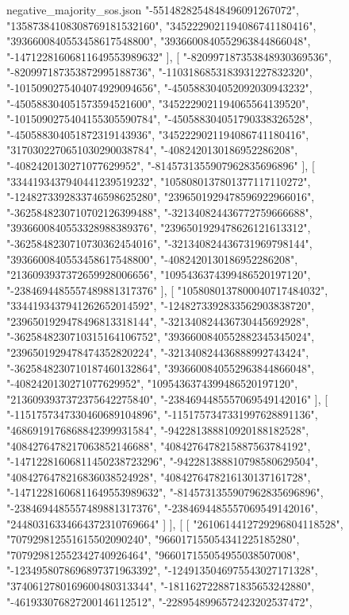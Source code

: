 \begin{filecontents*}[overwrite]{negative_majority_sos.json}
    "-5514828254848496091267072",
    "13587384108308769181532160",
    "3452229021194086741180416",
    "3936600840553458617548800",
    "3936600840552963844866048",
    "-14712281606811649553989632"
   ],
   [
    "-820997187353848930369536",
    "-820997187353872995188736",
    "-1103186853183931227832320",
    "-1015090275404074929094656",
    "-450588304052092030943232",
    "-450588304051573594521600",
    "3452229021194065564139520",
    "-1015090275404155305590784",
    "-450588304051790338326528",
    "-450588304051872319143936",
    "3452229021194086741180416",
    "3170302270651030290038784",
    "-4082420130186952286208",
    "-4082420130271077629952",
    "-8145731355907962835696896"
   ],
   [
    "3344193437940441239519232",
    "1058080137801377117110272",
    "-1248273392833746598625280",
    "2396501929478596922966016",
    "-3625848230710702126399488",
    "-321340824436772759666688",
    "3936600840553328988389376",
    "2396501929478626121613312",
    "-3625848230710730362454016",
    "-321340824436731969798144",
    "3936600840553458617548800",
    "-4082420130186952286208",
    "2136093937372659928006656",
    "1095436374399486520197120",
    "-2384694485557489881317376"
   ],
   [
    "1058080137800040717484032",
    "3344193437941262652014592",
    "-1248273392833562903838720",
    "2396501929478496813318144",
    "-321340824436730445692928",
    "-3625848230710315164106752",
    "3936600840552882345345024",
    "2396501929478474352820224",
    "-321340824436888992743424",
    "-3625848230710187460132864",
    "3936600840552963844866048",
    "-4082420130271077629952",
    "1095436374399486520197120",
    "2136093937372375642275840",
    "-2384694485557069549142016"
   ],
   [
    "-1151757347330460689104896",
    "-1151757347331997628891136",
    "4686919176868842399931584",
    "-942281388810920188182528",
    "4084276478217063852146688",
    "4084276478215887563784192",
    "-14712281606811450238723296",
    "-942281388810798580629504",
    "4084276478216836038524928",
    "4084276478216130137161728",
    "-14712281606811649553989632",
    "-8145731355907962835696896",
    "-2384694485557489881317376",
    "-2384694485557069549142016",
    "24480316334664372310769664"
   ]
  ],
  [
   [
    "2610614412729296804118528",
    "707929812551615502090240",
    "966017155054341225185280",
    "707929812552342740926464",
    "966017155054955038507008",
    "-1234958078696897371963392",
    "-1249135046975543027171328",
    "3740612780169600480313344",
    "-1811627228871835653242880",
    "-461933076827200146112512",
    "-2289548996572423202537472",

\end{filecontents*}
